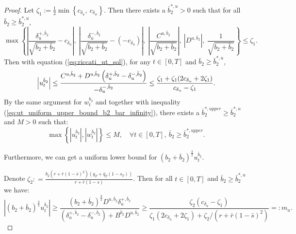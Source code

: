 \documentclass[11pt]{article}
\begin{document}
\begin{proof}
	\hspace{-7mm} Let $\zeta_1 := \frac{1}{2} \min \left\{ c_{\delta_u}, \  c_{\delta_w} \right\}$. Then there exists a $\bar{b}_2^{*,u} >0 $ such that for all $\bar{b}_2 \geq \bar{b}_2^{*,u}$,
	$$ \max\left\{ \left\vert \frac{\delta_u^{+,\bar{b}_2}}{\sqrt{b_2 + \bar{b}_2}} - c_{\delta_u} \right\vert , \ \left\vert \frac{\delta_u^{-,\bar{b}_2}}{\sqrt{b_2 + \bar{b}_2}} - (-c_{\delta_u})\right\vert,\    \left\vert \frac{C^{u,\bar{b}_2}}{\sqrt{b_2 + \bar{b}_2}} \right\vert, \   \left\vert D^{u,\bar{b}_2} \right\vert, \  \frac{1}{\sqrt{b_2 + \bar{b}_2}}  \right\} \leq \zeta_1. $$ 
	Then with equation (\ref{eq:riccati_ut_sol}), for any $t \in [0,T]$ and $\bar{b}_2 \geq \bar{b}_2^{*,u}$,
	\begin{equation}
	\left\vert u_t^{\bar{b}_2} \right\vert 
	\leq \frac{C^{u,\bar{b}_2}+ D^{u,\bar{b}_2} \left(\delta_u^{+,\bar{b}_2} - \delta_u^{-,\bar{b}_2} \right)}{- \delta_u^{-,\bar{b}_2}} \\
	\leq  \frac{\zeta_1 + \zeta_1 (2 c_{\delta_u} + 2 \zeta_1)}{ c_{\delta_u} - \zeta_1}.
	\label{eq:ut_uniform_upper_bound_b2_bar_infinity}
	\end{equation}
	By the same argument for $w_t^{b_2}$ and together with inequality (\ref{eq:ut_uniform_upper_bound_b2_bar_infinity}), there exists a $\bar{b}_2^{*,upper} \geq \bar{b}_2^{*,u}$ and $M>0$ such that:
	\begin{equation}
	\max \left\{ \left\vert u_t^{\bar{b}_2}\right\vert, \left\vert w_t^{\bar{b}_2} \right\vert \right\} \leq M, \quad \forall t \in[0,T],\ \bar{b}_2 \geq \bar{b}_2^{*,upper} .
	\label{eq:ut_wt_uniform_upper_bound_b2_bar_infty}
	\end{equation}
	
	Furthermore, we can get a uniform lower bound for $(b_2 + \bar{b}_2)^{\frac{3}{2}} u_t^{\bar{b}_2}$.
	
	\hspace{-7mm}Denote $\zeta_2: = \frac{b_2 (r + \bar{r}(1-\bar{s})^2) (q_T + \bar{q}_T(1-s_T))}{r + \bar{r}(1-s)}$. Then for all $t \in [0,T]$ and $\bar{b}_2 \geq \bar{b}_2^{*,u}$ we have:
	\begin{equation}
	\left\vert (b_2 + \bar{b}_2)^{\frac{3}{2}} u_t^{\bar{b}_2} \right\vert \geq    \frac{ (b_2 + \bar{b}_2)^{\frac{3}{2}} D^{u,\bar{b}_2} \delta_u^{+,\bar{b}_2}}{(\delta_u^{+,\bar{b}_2} - \delta_u^{-,\bar{b}_2}) + B^{\bar{b}_2} D^{u,\bar{b}_2} } 
	\geq  \frac{\zeta_2 \left(c_{\delta_u} - \zeta_1\right)}{ \zeta_1 \left(2 c_{\delta_u} + 2 \zeta_1\right) + \zeta_2 / (r+ \bar{r}(1-\bar{s})^2) } =: m_u.
	\label{eq:ut_lower_bound_b2_bar_infty}
	\end{equation}
	

\end{proof}
\end{document}

